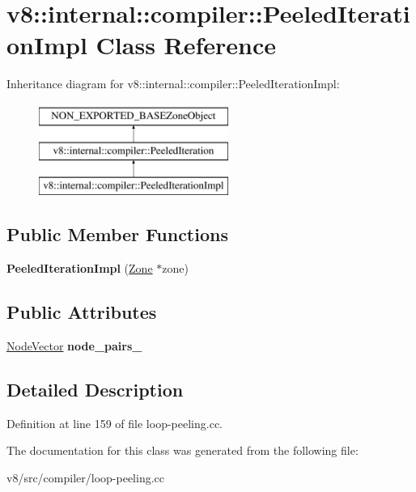 \hypertarget{classv8_1_1internal_1_1compiler_1_1PeeledIterationImpl}{}\section{v8\+:\+:internal\+:\+:compiler\+:\+:Peeled\+Iteration\+Impl Class Reference}
\label{classv8_1_1internal_1_1compiler_1_1PeeledIterationImpl}
Inheritance diagram for v8\+:\+:internal\+:\+:compiler\+:\+:Peeled\+Iteration\+Impl\+:\begin{figure}[H]
\begin{center}
\leavevmode
\includegraphics[height=3.000000cm]{classv8_1_1internal_1_1compiler_1_1PeeledIterationImpl}
\end{center}
\end{figure}
\subsection*{Public Member Functions}
\begin{DoxyCompactItemize}
\item 
\mbox{\label{classv8_1_1internal_1_1compiler_1_1PeeledIterationImpl_a66146e341c3bc048a242746bd6af9848}} 
{\bfseries Peeled\+Iteration\+Impl} (\mbox{\hyperlink{classv8_1_1internal_1_1Zone}{Zone}} $\ast$zone)
\end{DoxyCompactItemize}
\subsection*{Public Attributes}
\begin{DoxyCompactItemize}
\item 
\mbox{\label{classv8_1_1internal_1_1compiler_1_1PeeledIterationImpl_a7e04007a052302eea373c4eedf91a93d}} 
\mbox{\hyperlink{classv8_1_1internal_1_1ZoneVector}{Node\+Vector}} {\bfseries node\+\_\+pairs\+\_\+}
\end{DoxyCompactItemize}


\subsection{Detailed Description}


Definition at line 159 of file loop-\/peeling.\+cc.



The documentation for this class was generated from the following file\+:\begin{DoxyCompactItemize}
\item 
v8/src/compiler/loop-\/peeling.\+cc\end{DoxyCompactItemize}

